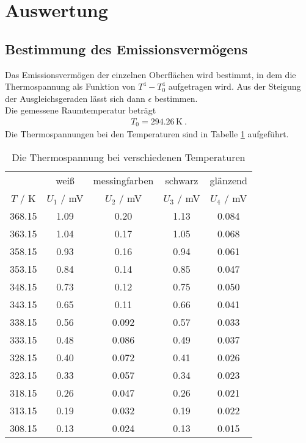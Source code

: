 \section{Auswertung}
\label{sec:Auswertung}

\subsection{Bestimmung des Emissionsvermögens}
Das Emissionsvermögen der einzelnen Oberflächen wird bestimmt, in dem die Thermospannung als Funktion von $T^4 - T_0^4$ aufgetragen wird. Aus der Steigung der Ausgleichsgeraden lässt sich dann $\epsilon$ bestimmen. \\
Die gemessene Raumtemperatur beträgt
\begin{align*}
  T_0 = 294.26 \, \text{K} \ .
\end{align*}
Die Thermospannungen bei den Temperaturen sind in Tabelle \ref{tab:Daten} aufgeführt.
\begin{table}
  \centering
  \begin{tabular}{c c c c c}
    \toprule
    	& \multicolumn{1}{c}{weiß} & \multicolumn{1}{c}{messingfarben} &	\multicolumn{1}{c}{schwarz} & \multicolumn{1}{c}{glänzend} \\
    $T$ / K & $U_\text{1}$ / mV & $U_\text{2}$ / mV & $U_\text{3}$ / mV & $U_\text{4}$ / mV \\
    \midrule
      368.15	&  1.09	&  0.20	 & 1.13  & 0.084 \\
      363.15	&  1.04	&  0.17	 & 1.05  & 0.068 \\
      358.15	&  0.93	&  0.16	 & 0.94  & 0.061 \\
      353.15	&  0.84	&  0.14	 & 0.85  & 0.047 \\
      348.15	&  0.73	&  0.12	 & 0.75  & 0.050 \\
      343.15	&  0.65	&  0.11	 & 0.66  & 0.041 \\
      338.15	&  0.56 &  0.092 & 0.57  & 0.033 \\
      333.15	&  0.48	&  0.086 & 0.49  & 0.037 \\
      328.15	&  0.40	&  0.072 & 0.41  & 0.026 \\
      323.15	&  0.33	&  0.057 & 0.34  & 0.023 \\
      318.15	&  0.26	&  0.047 & 0.26  & 0.021 \\
      313.15	&  0.19	&  0.032 & 0.19  & 0.022 \\
      308.15	&  0.13	&  0.024 & 0.13  & 0.015 \\
    \bottomrule
  \end{tabular}
  \caption{Die Thermospannung bei verschiedenen Temperaturen}
  \label{tab:Daten}
\end{table}

